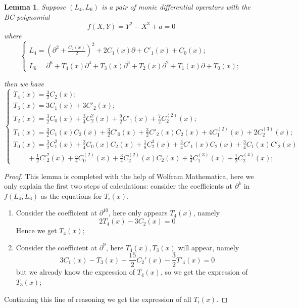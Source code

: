 \documentclass[11pt]{article}
\theoremstyle{definition}
\theoremstyle{plain}
\newtheorem{lemma}{Lemma}[section]
\numberwithin{equation}{section}
\begin{document}
\begin{lemma}
	\label{L:L6}
Suppose $(L_4,L_6)$ is a pair of monic differential operators with the BC-polynomial  $$f(X,Y)=Y^2-X^3+a=0$$
where
\begin{equation}\label{L46}
\begin{cases}
L_4=(\partial^2+\frac{C_2(x)}{2})^2+2C_1(x)\partial +C'_1(x)+C_0(x);
\\L_6=\partial^6+T_4(x)\partial^4+T_3(x)\partial^3+T_2(x)\partial^2+
T_1(x)\partial+T_0(x);
\end{cases}
\end{equation}


then we have
\begin{equation}\label{Tix}
\begin{cases}
T_4(x) = \frac{3}{2} C_2(x);
\\T_3(x) = 3 C_1(x) + 3 C'_2(x);
\\T_2(x)=\frac{3}{2}C_{0}(x)+\frac{3}{4}C^{2}_2(x)+\frac{9}{2}C'_{1}(x)+\frac{7}{2}C^{(2)}_{2}(x);
\\T_1(x)=\frac{3}{2}C_1(x)C_2(x)+\frac{3}{2}C'_{0}(x)+\frac{3}{2}C'_2(x)C_2(x)+4C^{(2)}_1(x)+2C^{(3)}_2(x);
\\T_0(x)=\frac{3}{2}C^2_1(x)+\frac{3}{4}C_0(x)C_2(x)+\frac{1}{8}C^3_2(x)+\frac{3}{4}C'_1(x)C_2(x)+\frac{3}{4}C_1(x)C'_2(x)
\\\qquad+\frac{1}{2}C'^2_2(x)+\frac{5}{4}C^{(2)}_0(x)+\frac{3}{4}C^{(2)}_2(x)C_2(x)+\frac{5}{4}C^{(3)}_1(x)
+\frac{1}{2}C^{(4)}_2(x);
\end{cases}
\end{equation}
\end{lemma}
\begin{proof}
	This lemma is completed with the help of Wolfram Mathematica, here we only explain the first two steps of calculations: consider the coefficients at $\partial^{k}$ in $f(L_4,L_6)$ as the equations for $T_i(x)$.
	\begin{enumerate}
		\item Consider the coefficient at $\partial^{10}$, here only appears $T_{4}(x)$, namely
		$$2T_4(x)-3C_{2}(x)=0 $$ 
		Hence we get $T_4(x)$;
		\item Consider the coefficient at $\partial^{9}$, here $T_{4}(x),T_3(x)$ will appear, namely
		$$
		3 C_1(x) - T_3(x) + \frac{15}{2} C_2'(x) - 
		\frac{3}{2} T'_{4}(x)=0
		$$
		but we already know the expression of $T_4(x)$, so we get the expression of $T_{3}(x)$;
		\end{enumerate} 
Continuing this line of reasoning  we  get the expression of all $T_i(x)$.
\end{proof}
\end{document}
